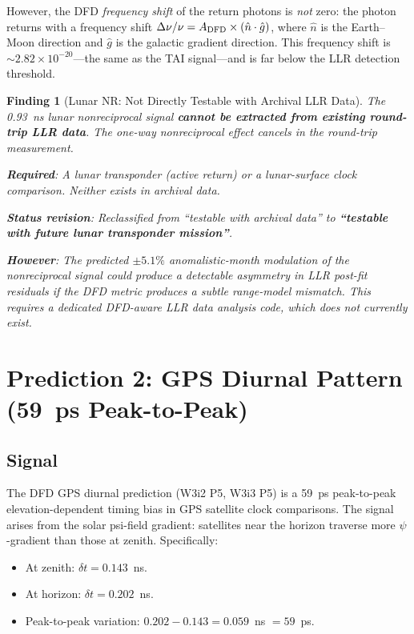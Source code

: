 \documentclass[11pt]{article}
\newtheorem{finding}{Finding}
\newcommand{\ee}[1]{\times 10^{#1}}
\begin{document}
However, the DFD \emph{frequency shift} of the return photons is
\emph{not} zero: the photon returns with a frequency shift
$\Delta\nu/\nu = A_{\rm DFD}\times(\hat{n}\cdot\hat{g})$, where
$\hat{n}$ is the Earth--Moon direction and $\hat{g}$ is the galactic
gradient direction. This frequency shift is $\sim 2.82\ee{-20}$---the
same as the TAI signal---and is far below the LLR detection threshold.

\begin{finding}[Lunar NR: Not Directly Testable with Archival LLR Data]
\label{find:lunar-not-archival}
The 0.93~ns lunar nonreciprocal signal \textbf{cannot be extracted from
existing round-trip LLR data}. The one-way nonreciprocal effect cancels
in the round-trip measurement.

\textbf{Required}: A lunar transponder (active return) or a lunar-surface
clock comparison. Neither exists in archival data.

\textbf{Status revision}: Reclassified from ``testable with archival data''
to \textbf{``testable with future lunar transponder mission''}.

\textbf{However}: The predicted $\pm 5.1\%$ anomalistic-month modulation
of the nonreciprocal signal \emph{could} produce a detectable asymmetry
in LLR post-fit residuals if the DFD metric produces a subtle range-model
mismatch. This requires a dedicated DFD-aware LLR data analysis code,
which does not currently exist.
\end{finding}

\section{Prediction 2: GPS Diurnal Pattern (59~ps Peak-to-Peak)}
\label{sec:archival-GPS}

\subsection{Signal}

The DFD GPS diurnal prediction (W3i2 P5, W3i3 P5) is a 59~ps
peak-to-peak elevation-dependent timing bias in GPS satellite clock
comparisons. The signal arises from the solar psi-field gradient:
satellites near the horizon traverse more $\psi$-gradient than those
at zenith. Specifically:
\begin{itemize}[nosep]
\item At zenith: $\delta t = 0.143$~ns.
\item At horizon: $\delta t = 0.202$~ns.
\item Peak-to-peak variation: $0.202 - 0.143 = 0.059$~ns $= 59$~ps.
\end{itemize}
\end{document}

